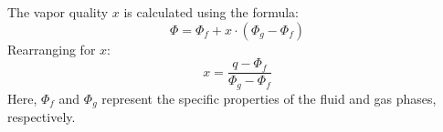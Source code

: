 The vapor quality \( x \) is calculated using the formula:  
\[
\Phi = \Phi_f + x \cdot (\Phi_g - \Phi_f)
\]  
Rearranging for \( x \):  
\[
x = \frac{q - \Phi_f}{\Phi_g - \Phi_f}
\]  
Here, \( \Phi_f \) and \( \Phi_g \) represent the specific properties of the fluid and gas phases, respectively.